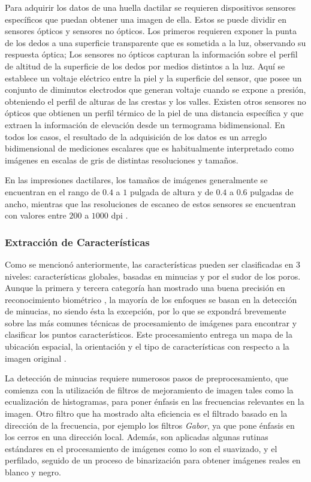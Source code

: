 Para adquirir los datos de una huella dactilar se requieren dispositivos sensores específicos que puedan obtener una imagen de ella. Estos se puede dividir en sensores ópticos y sensores no ópticos. Los primeros requieren exponer la punta de los dedos a una superficie transparente que es sometida a la luz, observando su respuesta óptica; Los sensores no ópticos capturan la información sobre el perfil de altitud de la superficie de los dedos por medios distintos a la luz. Aquí se establece un voltaje eléctrico entre la piel y la superficie del sensor, que posee un conjunto de diminutos electrodos que generan voltaje cuando se expone a presión, obteniendo el perfil de alturas de las crestas y los valles. Existen otros sensores no ópticos que obtienen un perfil térmico de la piel de una distancia específica y que extraen la información de elevación desde un termograma bidimensional. En todos los casos, el resultado de la adquisición de los datos es un arreglo bidimensional de mediciones escalares que es habitualmente interpretado como imágenes en escalas de gris de distintas resoluciones y tamaños.

En las impresiones dactilares, los tamaños de imágenes generalmente se encuentran en el rango de $0.4$ a $1$ pulgada de altura y de $0.4$ a $0.6$ pulgadas de ancho, mientras que las resoluciones de escaneo de estos sensores se encuentran con valores entre $200$ a $1000$ dpi \cite{Mal03}.

\subsubsection*{Extracción de Características}

Como se mencionó anteriormente, las características pueden ser clasificadas en 3 niveles: características globales, basadas en minucias y por el sudor de los poros. Aunque la primera y tercera categoría han mostrado una buena precisión en reconocimiento biométrico \cite{Bal97}, la mayoría de los enfoques se basan en la detección de minucias, no siendo ésta la excepción, por lo que se expondrá brevemente sobre las más comunes técnicas de procesamiento de imágenes para encontrar y clasificar los puntos característicos. Este procesamiento entrega un mapa de la ubicación espacial, la orientación y el tipo de características con respecto a la imagen original \cite{Rod97}.


La detección de minucias requiere numerosos pasos de preprocesamiento, que comienza con la utilización de filtros de mejoramiento de imagen tales como la ecualización de histogramas, para poner énfasis en las frecuencias relevantes en la imagen. Otro filtro que ha mostrado alta eficiencia es el filtrado basado en la dirección de la frecuencia, por ejemplo los filtros \emph{Gabor}, ya que pone énfasis en los cerros en una dirección local. Además, son aplicadas algunas rutinas estándares en el procesamiento de imágenes como lo son el suavizado, y el perfilado, seguido de un proceso de binarización para obtener imágenes reales en blanco y negro.


